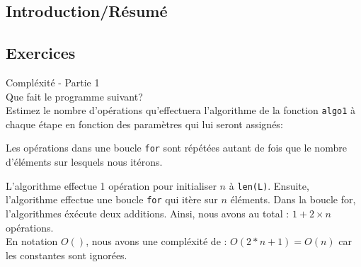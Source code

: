 \subsection{Introduction/Résumé}

\subsection{Exercices}

\begin{Exercice}[5 min] Compléxité - Partie 1\\
    Que fait le programme suivant? \\
    Estimez le nombre d'opérations qu'effectuera l'algorithme de la fonction \lstinline{algo1} à chaque étape en fonction des paramètres qui lui seront assignés:
    
\begin{conseil}
   Les opérations dans une boucle \lstinline{for} sont répétées autant de fois que le 
   nombre d'éléments sur lesquels nous itérons.
\end{conseil}
    
\begin{solution}
L'algorithme effectue 1 opération pour initialiser $n$ à \lstinline{len(L)}. Ensuite, l'algorithme
effectue une boucle \lstinline{for} qui itère sur $n$ éléments. Dans la boucle for, l'algorithmes éxécute deux additions.
Ainsi, nous avons au total : $1 + 2\times n$ opérations. \\
En notation $O()$, nous avons une compléxité de : $O(2*n + 1) = O(n)$ car les constantes sont ignorées.    
\end{solution}

\end{Exercice}

